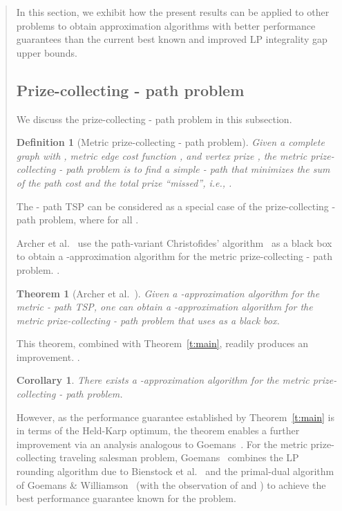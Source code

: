 \documentclass[11pt,letterpaper]{article}
\newtheorem{thm}{Theorem}
\newtheorem{cor}{Corollary}
\newtheorem{defn}{Definition}
\newcommand{\st}{\mbox{-} }
\begin{document}
\begin{quote}
In this section, we exhibit how the present results can be applied to other problems to obtain approximation algorithms with better performance guarantees than the current best known and improved LP integrality gap upper bounds.

\subsection{Prize-collecting \st path problem}\label{ss:prize}

We discuss the prize-collecting \st path problem in this subsection.

\begin{defn}[Metric prize-collecting \st path problem]
Given a complete graph  with , metric edge cost function , and vertex prize , the metric prize-collecting \st path problem is to find a simple \st path  that minimizes the sum of the path cost and the total prize ``missed'', i.e., .
\end{defn}

The \st path TSP can be considered as a special case of the prize-collecting \st path problem, where  for all .

Archer et al.~\cite{ABHK} use the path-variant Christofides' algorithm~\cite{H} as a black box to obtain a -approximation algorithm for the metric prize-collecting \st path problem. .

\begin{thm}[Archer et al.~\cite{ABHK}]\label{t:abhk}
Given a -approximation algorithm  for the  metric \st path TSP, one can obtain a -approximation algorithm for the metric prize-collecting \st path problem that uses  as a black box.
\end{thm}

This theorem, combined with Theorem~\ref{t:main}, readily produces an improvement. .

\begin{cor}
There exists a -approximation algorithm for the metric prize-collecting \st path problem.
\end{cor}

However, as the performance guarantee established by Theorem~\ref{t:main} is in terms of the Held-Karp optimum, the theorem enables a further improvement via an analysis analogous to Goemans~\cite{G:pc}. For the metric prize-collecting traveling salesman problem, Goemans~\cite{G:pc} combines the LP rounding algorithm due to Bienstock et al.~\cite{BGSW} and the primal-dual algorithm of Goemans \& Williamson~\cite{GW} (with the observation of \cite{CRW} and \cite{ABHK}) to achieve the best performance guarantee known for the problem.


\end{quote}
\end{document}
